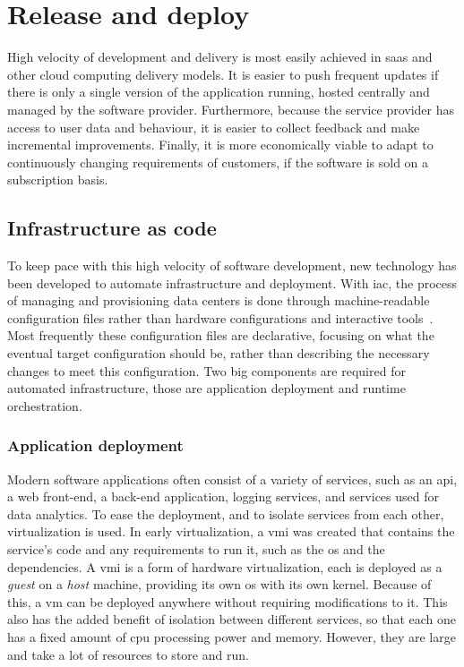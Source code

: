 \section{Release and deploy}

High velocity of development and delivery is most easily achieved in \gls{saas} and other cloud computing delivery models.
It is easier to push frequent updates if there is only a single version of the application running, hosted centrally and managed by the software provider.
Furthermore, because the service provider has access to user data and behaviour, it is easier to collect feedback and make incremental improvements.
Finally, it is more economically viable to adapt to continuously changing requirements of customers, if the software is sold on a subscription basis.

\subsection{Infrastructure as code}
To keep pace with this high velocity of software development, new technology has been developed to automate infrastructure and deployment.
With \gls{iac}, the process of managing and provisioning data centers is done through machine-readable configuration files rather than hardware configurations and interactive tools~\cite{wittig2018amazon}.
Most frequently these configuration files are declarative, focusing on what the eventual target configuration should be, rather than describing the necessary changes to meet this configuration.
Two big components are required for automated infrastructure, those are application deployment and runtime orchestration.

\subsubsection{Application deployment}
Modern software applications often consist of a variety of services, such as an \gls{api}, a web front-end, a back-end application, logging services, and services used for data analytics.
To ease the deployment, and to isolate services from each other, virtualization is used.
In early virtualization, a \gls{vmi} was created that contains the service's code and any requirements to run it, such as the \gls{os} and the dependencies.
A \gls{vmi} is a form of hardware virtualization, each is deployed as a \textit{guest} on a \textit{host} machine, providing its own \gls{os} with its own kernel.
Because of this, a \gls{vm} can be deployed anywhere without requiring modifications to it.
This also has the added benefit of isolation between different services, so that each one has a fixed amount of \gls{cpu} processing power and memory.
However, they are large and take a lot of resources to store and run.

